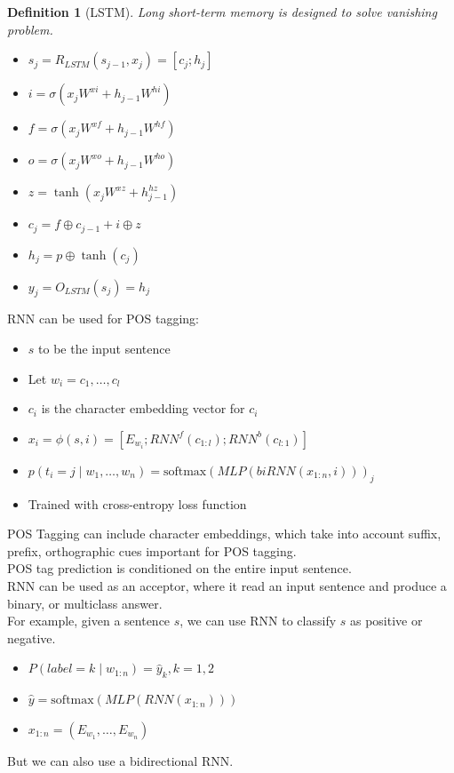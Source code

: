 \documentclass[12pt]{article}
\newtheorem{definition}{Definition}[section]
\theoremstyle{definition}
\begin{document}
\begin{definition}[LSTM]
Long short-term memory is designed to solve vanishing problem.
\begin{itemize}
	\item $s_j = R_{LSTM}(s_{j-1}, x_j) = [c_j; h_j]$
	\item $i = \sigma(x_jW^{xi} + h_{j-1}W^{hi})$
	\item $f = \sigma(x_jW^{xf} + h_{j-1}W^{hf})$
	\item $o = \sigma(x_jW^{xo} + h_{j-1}W^{ho})$
	\item $z = \tanh(x_jW^{xz} + h_{j-1}^{hz})$
	\item $c_j = f\oplus c_{j-1} + i\oplus z$
	\item $h_j = p\oplus \tanh(c_j)$
	\item $y_j = O_{LSTM}(s_j) = h_j$
\end{itemize}
\end{definition}
RNN can be used for POS tagging:
\begin{itemize}
	\item $s$ to be the input sentence
	\item Let $w_i = c_1,\ldots, c_l$
	\item $c_i$ is the character embedding vector for $c_i$
	\item $x_i = \phi(s,i) = [E_{w_i}; RNN^f(c_{1:l}); RNN^b(c_{l:1})]$
	\item $p(t_i = j\mid w_1,\ldots, w_n) = \text{softmax}(MLP(biRNN(x_{1:n}, i)))_j$
	\item Trained with cross-entropy loss function
\end{itemize}
POS Tagging can include character embeddings, which take into account suffix, prefix, orthographic cues important for POS tagging.\\
POS tag prediction is conditioned on the entire input sentence.\\
RNN can be used as an acceptor, where it read an input sentence and produce a binary, or multiclass answer.\\
For example, given a sentence $s$, we can use RNN to classify $s$ as positive or negative.\\
\begin{itemize}
	\item $P(label = k \mid w_{1:n}) = \hat{y}_k, k = 1,2$
	\item $\hat{y} = \text{softmax}(MLP(RNN(x_{1:n})))$
	\item $x_{1:n} = (E_{w_1},\ldots,E_{w_n})$
\end{itemize}
But we can also use a bidirectional RNN.
\clearpage
\end{document}
